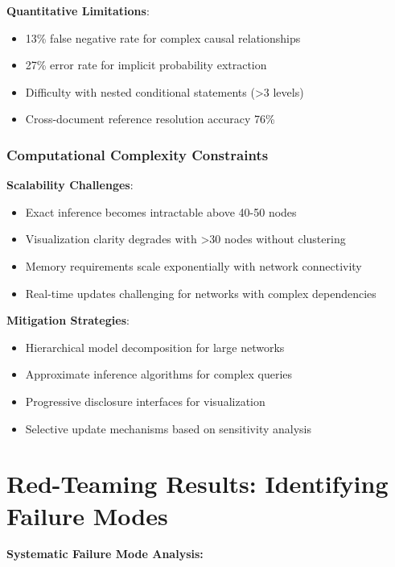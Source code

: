 \documentclass[
  11pt,
  letterpaper,
]{book}
\providecommand{\tightlist}{%
  \setlength{\itemsep}{0pt}\setlength{\parskip}{0pt}}
\begin{document}
\textbf{Quantitative Limitations}:

\begin{itemize}
\tightlist
\item
  13\% false negative rate for complex causal relationships
\item
  27\% error rate for implicit probability extraction
\item
  Difficulty with nested conditional statements (\textgreater3 levels)
\item
  Cross-document reference resolution accuracy 76\%
\end{itemize}

\subsubsection{Computational Complexity
Constraints}\label{sec-computational-constraints}

\textbf{Scalability Challenges}:

\begin{itemize}
\tightlist
\item
  Exact inference becomes intractable above 40-50 nodes
\item
  Visualization clarity degrades with \textgreater30 nodes without
  clustering
\item
  Memory requirements scale exponentially with network connectivity
\item
  Real-time updates challenging for networks with complex dependencies
\end{itemize}

\textbf{Mitigation Strategies}:

\begin{itemize}
\tightlist
\item
  Hierarchical model decomposition for large networks
\item
  Approximate inference algorithms for complex queries
\item
  Progressive disclosure interfaces for visualization
\item
  Selective update mechanisms based on sensitivity analysis
\end{itemize}

\section{Red-Teaming Results: Identifying Failure
Modes}\label{sec-red-teaming}

\textbf{Systematic Failure Mode Analysis:}
\end{document}

